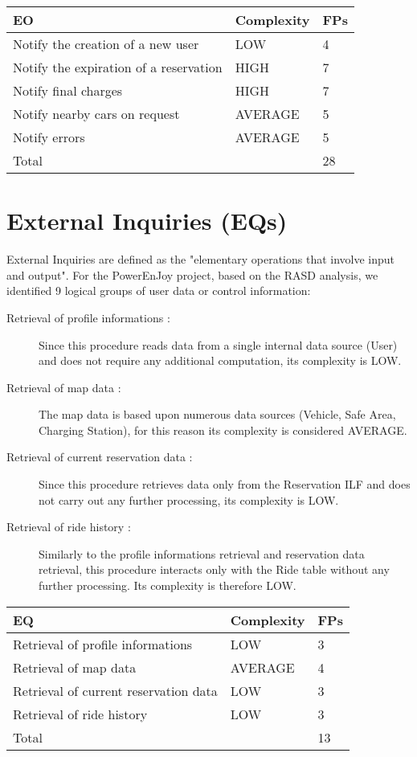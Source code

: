 \begin{center}
  \begin{tabular}{ |l|l|l| }
    \hline
    EO & Complexity & FPs \\ \hline
    Notify the creation of a new user & LOW & 4 \\ \hline
    Notify the expiration of a reservation & HIGH & 7 \\ \hline
    Notify final charges & HIGH & 7 \\ \hline
    Notify nearby cars on request & AVERAGE & 5 \\ \hline
    Notify errors & AVERAGE & 5 \\ \hline
    \multicolumn{2}{|l|}{Total} & 28 \\ \hline
  \end{tabular}
\end{center}


\newpage
\section{External Inquiries (EQs)}

External Inquiries are defined as the "elementary operations that involve input and output". For the PowerEnJoy project, based on the RASD analysis, we identified 9 logical groups of user data or control information: \\

\begin{description}
	\item [Retrieval of profile informations :] Since this procedure reads data from a single internal data source (User) and does not require any additional computation, its complexity is LOW. 
	\item [Retrieval of map data :] The map data is based upon numerous data sources (Vehicle, Safe Area, Charging Station), for this reason its complexity is considered AVERAGE.
	\item [Retrieval of current reservation data :] Since this procedure retrieves data only from the Reservation ILF and does not carry out any further processing, its complexity is LOW.
	\item [Retrieval of ride history :] Similarly to the profile informations retrieval and reservation data retrieval, this procedure interacts only with the Ride table without any further processing. Its complexity is therefore LOW.
\end{description}

\begin{center}
  \begin{tabular}{ |l|l|l| }
    \hline
    EQ & Complexity & FPs \\ \hline
    Retrieval of profile informations & LOW & 3 \\ \hline
    Retrieval of map data & AVERAGE & 4 \\ \hline
    Retrieval of current reservation data & LOW & 3 \\ \hline
    Retrieval of ride history & LOW & 3 \\ \hline
    \multicolumn{2}{|l|}{Total} & 13 \\ \hline
  \end{tabular}
\end{center}


